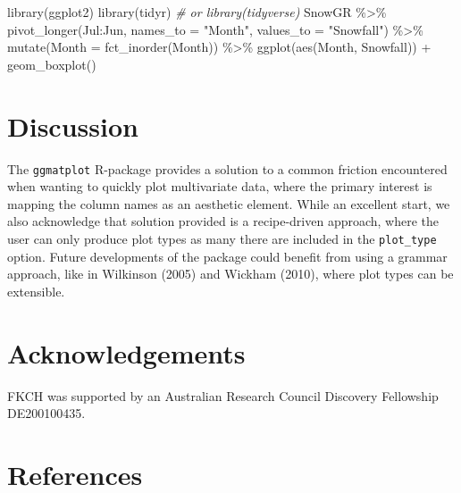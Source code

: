 \documentclass[10pt,a4paper,onecolumn]{article}
\newenvironment{Shaded}{\begin{snugshade}}{\end{snugshade}}
\newcommand{\AttributeTok}[1]{\textcolor[rgb]{0.77,0.63,0.00}{#1}}
\newcommand{\CommentTok}[1]{\textcolor[rgb]{0.56,0.35,0.01}{\textit{#1}}}
\newcommand{\FunctionTok}[1]{\textcolor[rgb]{0.00,0.00,0.00}{#1}}
\newcommand{\NormalTok}[1]{#1}
\newcommand{\SpecialCharTok}[1]{\textcolor[rgb]{0.00,0.00,0.00}{#1}}
\newcommand{\StringTok}[1]{\textcolor[rgb]{0.31,0.60,0.02}{#1}}
\begin{document}
\begin{Shaded}
\begin{Highlighting}[]
\FunctionTok{library}\NormalTok{(ggplot2)}
\FunctionTok{library}\NormalTok{(tidyr) }\CommentTok{\# or library(tidyverse)}
\NormalTok{SnowGR }\SpecialCharTok{\%\textgreater{}\%} 
  \FunctionTok{pivot\_longer}\NormalTok{(Jul}\SpecialCharTok{:}\NormalTok{Jun, }
               \AttributeTok{names\_to =} \StringTok{"Month"}\NormalTok{,}
               \AttributeTok{values\_to =} \StringTok{"Snowfall"}\NormalTok{) }\SpecialCharTok{\%\textgreater{}\%} 
  \FunctionTok{mutate}\NormalTok{(}\AttributeTok{Month =} \FunctionTok{fct\_inorder}\NormalTok{(Month)) }\SpecialCharTok{\%\textgreater{}\%} 
  \FunctionTok{ggplot}\NormalTok{(}\FunctionTok{aes}\NormalTok{(Month, Snowfall)) }\SpecialCharTok{+} 
  \FunctionTok{geom\_boxplot}\NormalTok{()}
\end{Highlighting}
\end{Shaded}

\hypertarget{discussion}{%
\section{Discussion}\label{discussion}}

The \texttt{ggmatplot} R-package provides a solution to a common
friction encountered when wanting to quickly plot multivariate data,
where the primary interest is mapping the column names as an aesthetic
element. While an excellent start, we also acknowledge that solution
provided is a recipe-driven approach, where the user can only produce
plot types as many there are included in the \texttt{plot\_type} option.
Future developments of the package could benefit from using a grammar
approach, like in Wilkinson (2005) and Wickham (2010), where plot types
can be extensible.

\hypertarget{acknowledgements}{%
\section{Acknowledgements}\label{acknowledgements}}

FKCH was supported by an Australian Research Council Discovery
Fellowship DE200100435.

\hypertarget{references}{%
\section*{References}\label{references}}
\end{document}
